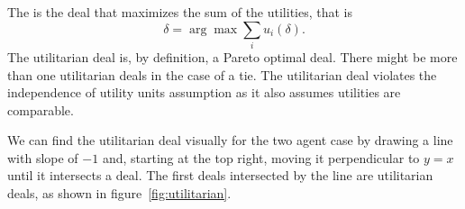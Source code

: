 The  is the deal that maximizes the sum of
the utilities, that is
\begin{equation}
  \label{eq:n-utilitarian}
  \delta = \arg \max \sum_i u_i(\delta).
\end{equation}
The utilitarian deal is, by definition, a Pareto optimal
deal. There might be more than one utilitarian deals in the case of a
tie. The utilitarian deal violates the independence of utility units
assumption as it also assumes utilities are comparable. 

  We can find the utilitarian deal
visually for the two agent case by drawing a line with slope of $-1$
and, starting at the top right, moving it perpendicular to $y=x$ until
it intersects a deal. The first deals intersected by the line are
utilitarian deals, as shown in figure~\ref{fig:utilitarian}.

\begin{SCfigure}
  \begin{minipage}{1.0\linewidth}
    \begin{center}
\end{center}
  \end{minipage}
\caption{Utilitarian deal. The line $y = b - x$ starts with a very
  large $b$ which is reduced until the line intersects a deal.}
  \label{fig:utilitarian}
\end{SCfigure}

